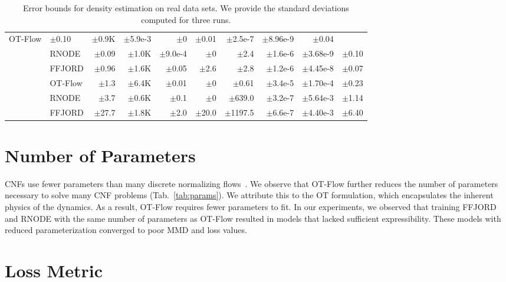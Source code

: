 \documentclass[letterpaper]{article}
\newcommand{\bsds}{\textsc{Bsds300}}
\newcommand{\model}{OT-Flow} %
\begin{document}
\begin{table*}
\begin{tabular}{clrrrrrrrr}
       	\model{} &  $\pm$0.10 & $\pm$0.9K & $\pm$5.9e-3 & $\pm$0  & $\pm$0.01 & $\pm$2.5e-7  & $\pm$8.96e-9 & $\pm$0.04\\
       	& RNODE  &  $\pm$0.09 & $\pm$1.0K & $\pm$9.0e-4 & $\pm$0  & $\pm$2.4  & $\pm$1.6e-6  & $\pm$3.68e-9 & $\pm$0.10\\
       	& FFJORD &  $\pm$0.96 & $\pm$1.6K & $\pm$0.05  & $\pm$2.6 & $\pm$2.8  & $\pm$1.2e-6  & $\pm$4.45e-8 & $\pm$0.07\\
    \midrule
    \multirow{3}{*}{\shortstack[*]{\textbf{\bsds{}}\\$d=$ 63}} & 
    	\model{} & $\pm$1.3  & $\pm$6.4K & $\pm$0.01 & $\pm$0  & $\pm$0.61  & $\pm$3.4e-5 & $\pm$1.70e-4 & $\pm$0.23\\
        & RNODE  & $\pm$3.7  & $\pm$0.6K & $\pm$0.1  & $\pm$0  & $\pm$639.0 & $\pm$3.2e-7 & $\pm$5.64e-3 & $\pm$1.14\\  
        & FFJORD & $\pm$27.7 & $\pm$1.8K & $\pm$2.0  & $\pm$20.0  & $\pm$1197.5 & $\pm$6.6e-7 & $\pm$4.40e-3 & $\pm$6.40\\      
    \bottomrule                            
    \end{tabular}
    \caption{Error bounds for density estimation on real data sets. We provide the standard deviations computed for three runs.} 
    \label{tab:error_bounds}  
\end{table*}%

\section{Number of Parameters}
\label{app:parameters}

	CNFs use fewer parameters than many discrete normalizing flows~\cite{chen2018neural}. We observe that \model{} further reduces the number of parameters necessary to solve many CNF problems (Tab.~\ref{tab:params}). We attribute this to the OT formulation, which encapsulates the inherent physics of the dynamics. As a result, \model{} requires fewer parameters to fit. In our experiments, we observed that training FFJORD and RNODE with the same number of parameters as \model{} resulted in models that lacked sufficient expressibility. These models with reduced parameterization converged to poor MMD and loss values.



\section{Loss Metric}
\label{app:test_loss}
	
\end{document}
